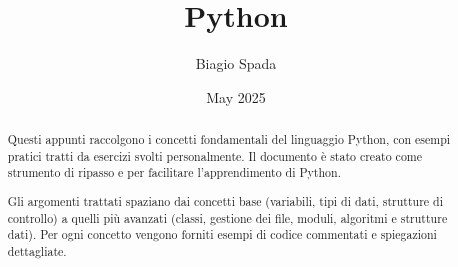 \documentclass[a4paper, 12pt]{article}
\title{Python}
\author{Biagio Spada}
\date{May 2025}
\begin{document}
\maketitle

\begin{abstract}
Questi appunti raccolgono i concetti fondamentali del linguaggio Python, con esempi pratici tratti da esercizi svolti personalmente. Il documento è stato creato come strumento di ripasso e per facilitare l'apprendimento di Python.

Gli argomenti trattati spaziano dai concetti base (variabili, tipi di dati, strutture di controllo) a quelli più avanzati (classi, gestione dei file, moduli, algoritmi e strutture dati). Per ogni concetto vengono forniti esempi di codice commentati e spiegazioni dettagliate.
\end{abstract}

\newpage
\tableofcontents
\newpage





























\end{document}
